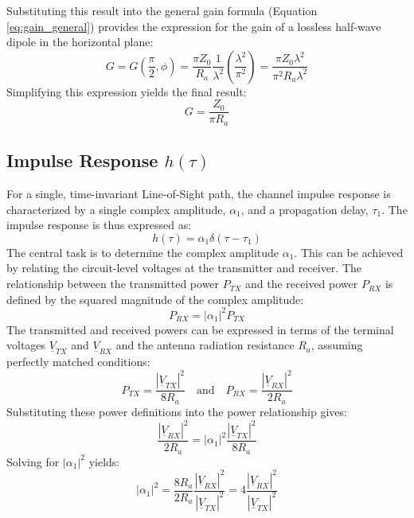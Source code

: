 Substituting this result into the general gain formula (Equation \ref{eq:gain_general}) provides the expression for the gain of a lossless half-wave dipole in the horizontal plane:
\begin{equation}
	G = G\left(\frac{\pi}{2}, \phi\right) = \frac{\pi Z_0}{R_a} \frac{1}{\lambda^2} \left(\frac{\lambda^2}{\pi^2}\right) = \frac{\pi Z_0 \lambda^2}{\pi^2 R_a \lambda^2}
\end{equation}
Simplifying this expression yields the final result:
\begin{equation}
	G = \frac{Z_0}{\pi R_a}
	\label{eq:gain_derived}
\end{equation}

\subsection{Impulse Response $h(\tau)$}
For a single, time-invariant Line-of-Sight path, the channel impulse response is characterized by a single complex amplitude, $\alpha_1$, and a propagation delay, $\tau_1$. The impulse response is thus expressed as:
\begin{equation}
	h(\tau) = \alpha_1 \delta(\tau - \tau_1)
\end{equation}
The central task is to determine the complex amplitude $\alpha_1$. This can be achieved by relating the circuit-level voltages at the transmitter and receiver. The relationship between the transmitted power $P_{TX}$ and the received power $P_{RX}$ is defined by the squared magnitude of the complex amplitude:
\begin{equation}
	P_{RX} = |\alpha_1|^2 P_{TX}
\end{equation}
The transmitted and received powers can be expressed in terms of the terminal voltages $\underline{V}_{TX}$ and $\underline{V}_{RX}$ and the antenna radiation resistance $R_a$, assuming perfectly matched conditions:
\begin{equation}
	P_{TX} = \frac{|\underline{V}_{TX}|^2}{8R_a} \quad \text{and} \quad P_{RX} = \frac{|\underline{V}_{RX}|^2}{2R_a}
\end{equation}
Substituting these power definitions into the power relationship gives:
\begin{equation}
	\frac{|\underline{V}_{RX}|^2}{2R_a} = |\alpha_1|^2 \frac{|\underline{V}_{TX}|^2}{8R_a}
\end{equation}
Solving for $|\alpha_1|^2$ yields:
\begin{equation}
	|\alpha_1|^2 = \frac{8R_a}{2R_a} \frac{|\underline{V}_{RX}|^2}{|\underline{V}_{TX}|^2} = 4 \frac{|\underline{V}_{RX}|^2}{|\underline{V}_{TX}|^2}
\end{equation}
